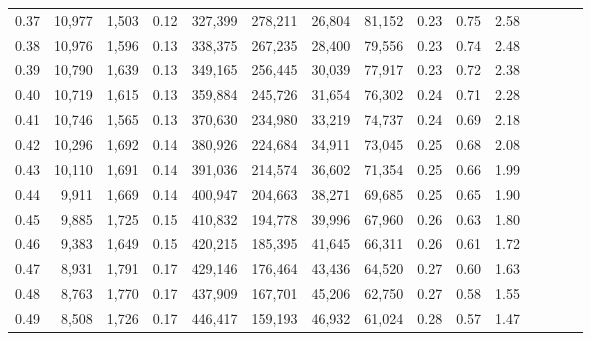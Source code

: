 \begin{tabular}{rrrcrrrrrrrrrrr}
0.37 &  10,977 &  1,503 &                                       0.12 &  327,399 &  278,211 &   26,804 &   81,152 &  0.23 &  0.75 &                         2.58 \\
0.38 &  10,976 &  1,596 &                                       0.13 &  338,375 &  267,235 &   28,400 &   79,556 &  0.23 &  0.74 &                         2.48 \\
0.39 &  10,790 &  1,639 &                                       0.13 &  349,165 &  256,445 &   30,039 &   77,917 &  0.23 &  0.72 &                         2.38 \\
0.40 &  10,719 &  1,615 &                                       0.13 &  359,884 &  245,726 &   31,654 &   76,302 &  0.24 &  0.71 &                         2.28 \\
0.41 &  10,746 &  1,565 &                                       0.13 &  370,630 &  234,980 &   33,219 &   74,737 &  0.24 &  0.69 &                         2.18 \\
0.42 &  10,296 &  1,692 &                                       0.14 &  380,926 &  224,684 &   34,911 &   73,045 &  0.25 &  0.68 &                         2.08 \\
0.43 &  10,110 &  1,691 &                                       0.14 &  391,036 &  214,574 &   36,602 &   71,354 &  0.25 &  0.66 &                         1.99 \\
0.44 &   9,911 &  1,669 &                                       0.14 &  400,947 &  204,663 &   38,271 &   69,685 &  0.25 &  0.65 &                         1.90 \\
0.45 &   9,885 &  1,725 &                                       0.15 &  410,832 &  194,778 &   39,996 &   67,960 &  0.26 &  0.63 &                         1.80 \\
0.46 &   9,383 &  1,649 &                                       0.15 &  420,215 &  185,395 &   41,645 &   66,311 &  0.26 &  0.61 &                         1.72 \\
0.47 &   8,931 &  1,791 &                                       0.17 &  429,146 &  176,464 &   43,436 &   64,520 &  0.27 &  0.60 &                         1.63 \\
0.48 &   8,763 &  1,770 &                                       0.17 &  437,909 &  167,701 &   45,206 &   62,750 &  0.27 &  0.58 &                         1.55 \\
0.49 &   8,508 &  1,726 &                                       0.17 &  446,417 &  159,193 &   46,932 &   61,024 &  0.28 &  0.57 &                         1.47 \\

\end{tabular}

